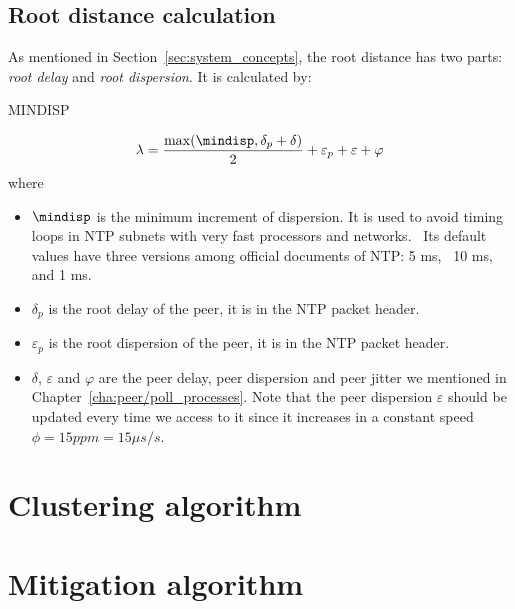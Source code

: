 \subsection{Root distance calculation}%
\label{sub:root_distance_calculation}
As mentioned in Section~\ref{sec:system_concepts}, the root distance has two
parts: \emph{root delay} and \emph{root dispersion}. It is calculated by:
\begin{myverbbox}
    {\mindisp}MINDISP
\end{myverbbox}
\begin{equation}
    \lambda = \frac{\max(\mindisp, \delta_p + \delta)}{2} 
    + \varepsilon_p + \varepsilon + \varphi
    \label{eq:root_distance}
\end{equation}
where 
\begin{itemize}
    \item $\mindisp$ is the minimum increment of dispersion.  It is used to
        avoid timing loops in NTP subnets with very fast processors and
        networks.~\cite{rfc5905} Its default values have three versions among
        official documents of NTP: 5 ms,~\cite{rfc5905} 10 ms,~\cite{rfc5905}
        and 1 ms.~\cite{performance_metrics}
    \item $\delta_p$ is the root delay of the peer, it is in the NTP packet
        header.
    \item $\varepsilon_p$ is the root dispersion of the peer, it is in the NTP
        packet header.
    \item $\delta$, $\varepsilon$ and $\varphi$  are the peer delay, peer
        dispersion and peer jitter we mentioned in
        Chapter~\ref{cha:peer/poll_processes}. Note that the peer dispersion
        $\varepsilon$ should be updated every time we access to it since it
        increases in a constant speed $\phi = 15 ppm = 15 \mu s/s$.
\end{itemize}



\section{Clustering algorithm}%
\label{sec:clustering_algorithm}

\section{Mitigation algorithm}%
\label{sec:mitigation_algorithm}



